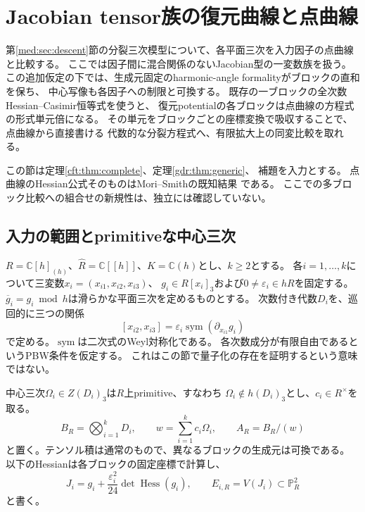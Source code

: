 \section{Jacobian tensor族の復元曲線と点曲線}
\label{mpc:sec:point-comparison}

第\ref{med:sec:descent}節の分裂三次模型について、各平面三次を入力因子の点曲線と比較する。
ここでは因子間に混合関係のないJacobian型の一変数族を扱う。
この追加仮定の下では、生成元固定のharmonic-angle formalityがブロックの直和を保ち、
中心写像も各因子への制限と可換する。
既存の一ブロックの全次数Hessian--Casimir恒等式を使うと、
復元potentialの各ブロックは点曲線の方程式の形式単元倍になる。
その単元をブロックごとの座標変換で吸収することで、点曲線から直接書ける
代数的な分裂方程式へ、有限拡大上の同変比較を取れる。

この節は定理\ref{cft:thm:complete}、定理\ref{gdr:thm:generic}、
補題を入力とする。
点曲線のHessian公式そのものはMori--Smithの既知結果
\cite[Theorems~1.2, 7.2]{MoriSmith}である。
ここでの多ブロック比較への組合せの新規性は、独立には確認していない。

\subsection{入力の範囲とprimitiveな中心三次}

$R=\mathbb C[h]_{(h)}$、$\widehat R=\mathbb C[[h]]$、$K=\mathbb C(h)$とし、$k\ge2$とする。
各$i=1,\ldots,k$について三変数$x_i=(x_{i1},x_{i2},x_{i3})$、
$g_i\in R[x_i]_3$および$0\ne\varepsilon_i\in hR$を固定する。
$\overline g_i=g_i\bmod h$は滑らかな平面三次を定めるものとする。
次数付き代数$D_i$を、巡回的に三つの関係
\begin{equation}\label{mpc:eq:factor-relations}
 [x_{i2},x_{i3}]
 =\varepsilon_i\operatorname{sym}(\partial_{x_{i1}}g_i)
\end{equation}
で定める。$\operatorname{sym}$は二次式のWeyl対称化である。
各次数成分が有限自由であるというPBW条件を仮定する。
これはこの節で量子化の存在を証明するという意味ではない。

中心三次$\Omega_i\in Z(D_i)_3$は$R$上primitive、すなわち
$\Omega_i\notin h(D_i)_3$とし、$c_i\in R^\times$を取る。
\begin{equation}\label{mpc:eq:input}
 B_R=\bigotimes_{i=1}^kD_i,
 \qquad w=\sum_{i=1}^k c_i\Omega_i,
 \qquad A_R=B_R/(w)
\end{equation}
と置く。テンソル積は通常のもので、異なるブロックの生成元は可換である。
以下のHessianは各ブロックの固定座標で計算し、
\begin{equation}\label{mpc:eq:point-polynomials}
 J_i=g_i+\frac{\varepsilon_i^2}{24}\det\operatorname{Hess}(g_i),
 \qquad E_{i,R}=V(J_i)\subset\mathbb P^2_R
\end{equation}
と書く。

